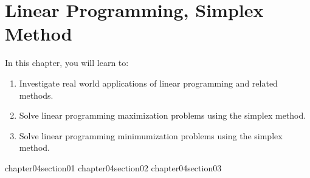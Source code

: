 \chapter{Linear Programming, Simplex Method}

In this chapter, you will learn to:

\begin{enumerate}
    \item Investigate real world applications of linear programming and related methods.
    \item Solve linear programming maximization problems using the simplex method.
    \item Solve linear programming minimumization problems using the simplex method.
\end{enumerate}


{chapter04section01}
{chapter04section02}
{chapter04section03}
